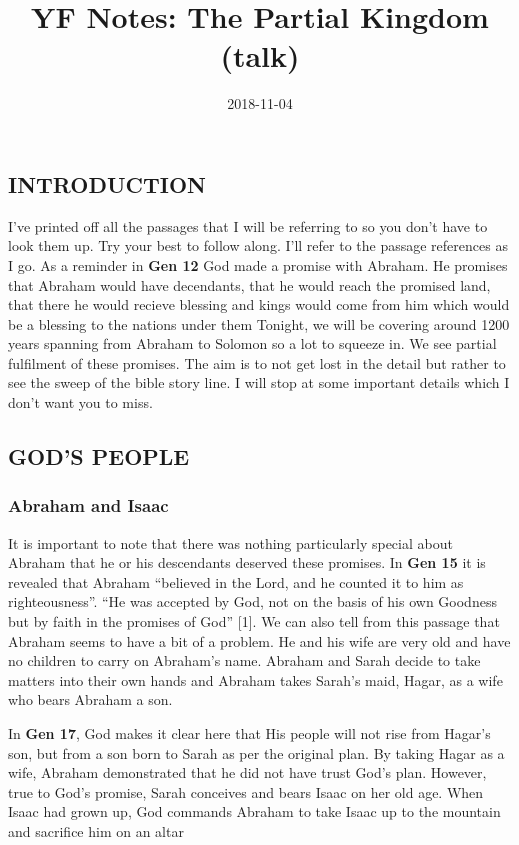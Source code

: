 \documentclass[]{article}
\title{YF Notes: The Partial Kingdom (talk)}
\author{}
\date{2018-11-04}
\begin{document}
\maketitle

\hypertarget{introduction}{%
\subsection{INTRODUCTION}\label{introduction}}

I've printed off all the passages that I will be referring to so you
don't have to look them up. Try your best to follow along. I'll refer to
the passage references as I go. As a reminder in \textbf{Gen 12} God
made a promise with Abraham. He promises that Abraham would have
decendants, that he would reach the promised land, that there he would
recieve blessing and kings would come from him which would be a blessing
to the nations under them Tonight, we will be covering around 1200 years
spanning from Abraham to Solomon so a lot to squeeze in. We see partial
fulfilment of these promises. The aim is to not get lost in the detail
but rather to see the sweep of the bible story line. I will stop at some
important details which I don't want you to miss.

\hypertarget{gods-people}{%
\subsection{GOD'S PEOPLE}\label{gods-people}}

\hypertarget{abraham-and-isaac}{%
\subsubsection{Abraham and Isaac}\label{abraham-and-isaac}}

It is important to note that there was nothing particularly special
about Abraham that he or his descendants deserved these promises. In
\textbf{Gen 15} it is revealed that Abraham ``believed in the Lord, and
he counted it to him as righteousness''. ``He was accepted by God, not
on the basis of his own Goodness but by faith in the promises of God''
{[}1{]}. We can also tell from this passage that Abraham seems to have a
bit of a problem. He and his wife are very old and have no children to
carry on Abraham's name. Abraham and Sarah decide to take matters into
their own hands and Abraham takes Sarah's maid, Hagar, as a wife who
bears Abraham a son.

In \textbf{Gen 17}, God makes it clear here that His people will not
rise from Hagar's son, but from a son born to Sarah as per the original
plan. By taking Hagar as a wife, Abraham demonstrated that he did not
have trust God's plan. However, true to God's promise, Sarah conceives
and bears Isaac on her old age. When Isaac had grown up, God commands
Abraham to take Isaac up to the mountain and sacrifice him on an altar
\end{document}
